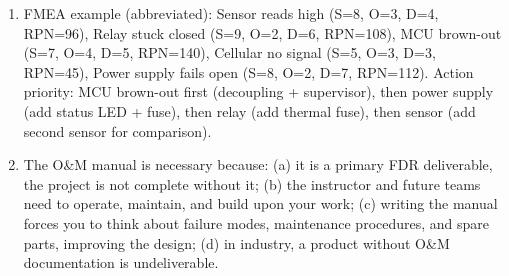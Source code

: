 \begin{enumerate}[leftmargin=1.5em]
\item FMEA example (abbreviated): Sensor reads high (S=8, O=3, D=4, RPN=96), Relay stuck closed (S=9, O=2, D=6, RPN=108), MCU brown-out (S=7, O=4, D=5, RPN=140), Cellular no signal (S=5, O=3, D=3, RPN=45), Power supply fails open (S=8, O=2, D=7, RPN=112). Action priority: MCU brown-out first (decoupling + supervisor), then power supply (add status LED + fuse), then relay (add thermal fuse), then sensor (add second sensor for comparison).
\item The O\&M manual is necessary because: (a) it is a primary FDR deliverable, the project is not complete without it; (b) the instructor and future teams need to operate, maintain, and build upon your work; (c) writing the manual forces you to think about failure modes, maintenance procedures, and spare parts, improving the design; (d) in industry, a product without O\&M documentation is undeliverable.
\end{enumerate}



